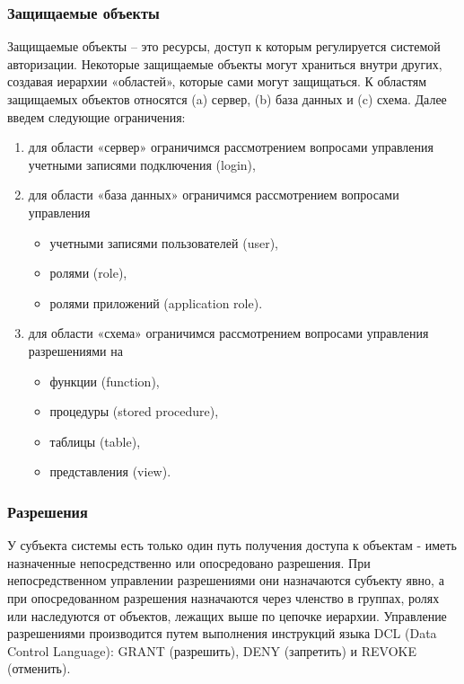 \subsubsection{Защищаемые объекты}

Защищаемые объекты – это ресурсы, доступ к которым регулируется
системой авторизации. Некоторые защищаемые объекты могут храниться
внутри других, создавая иерархии «областей», которые сами могут
защищаться. К областям защищаемых объектов относятся (a) сервер, (b)
база данных и (c) схема. Далее введем следующие ограничения:

\begin{enumerate}
	\item для области «сервер» ограничимся рассмотрением вопросами
	управления учетными записями подключения (login),
	\item для области «база данных» ограничимся рассмотрением вопросами
	управления
	
	\begin{itemize}
		\item учетными записями пользователей (user),
		\item ролями (role),
		\item ролями приложений (application role).
	\end{itemize}
	
	\item для области «схема» ограничимся рассмотрением вопросами
	управления разрешениями на
	
	\begin{itemize}
		\item функции (function),
		\item процедуры (stored procedure),
		\item таблицы (table),
		\item представления (view).
	\end{itemize}

\end{enumerate}

\subsubsection{Разрешения}

У субъекта системы есть только один путь получения доступа к объектам -
иметь назначенные непосредственно или опосредовано разрешения. При
непосредственном управлении разрешениями они назначаются субъекту
явно, а при опосредованном разрешения назначаются через членство в
группах, ролях или наследуются от объектов, лежащих выше по цепочке
иерархии. Управление разрешениями производится путем выполнения
инструкций языка DCL (Data Control Language): GRANT (разрешить), DENY
(запретить) и REVOKE (отменить).

